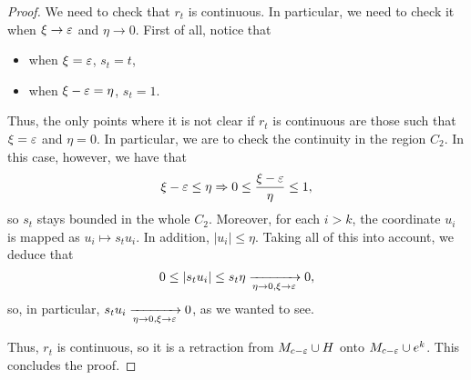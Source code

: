 \begin{proof}
We need to check that $r_t$ is continuous. In particular, we need to check it when $\xi \rightarrow \varepsilon$ and $\eta \rightarrow 0$. First of all, notice that

\begin{itemize}
	\item when $\xi = \varepsilon$, $s_t = t$,
	\item when $\xi - \varepsilon = \eta$, $s_t = 1$.
\end{itemize}

Thus, the only points where it is not clear if $r_t$ is continuous are those such that $\xi = \varepsilon$ and $\eta = 0$. In particular, we are to check the continuity in the region $C_2$. In this case, however, we have that
\[\xi - \varepsilon \leq \eta \Rightarrow 0 \leq \frac{\xi - \varepsilon}{\eta} \leq 1,\]
so $s_t$ stays bounded in the whole $C_2$. Moreover, for each $i > k$, the coordinate $u_i$ is mapped as $u_i \mapsto s_t u_i$. In addition, $|u_i| \leq \eta$. Taking all of this into account, we deduce that
\[0 \leq |s_tu_i| \leq s_t\eta \xrightarrow[\eta \rightarrow 0, \xi \rightarrow \varepsilon]{} 0 ,\]
so, in particular, $s_tu_i \xrightarrow[\eta \rightarrow 0, \xi \rightarrow \varepsilon]{} 0$, as we wanted to see.

Thus, $r_t$ is continuous, so it is a retraction from $M_{c-\varepsilon} \cup H$ onto $M_{c-\varepsilon} \cup e^k$. This concludes the proof.
\end{proof}
